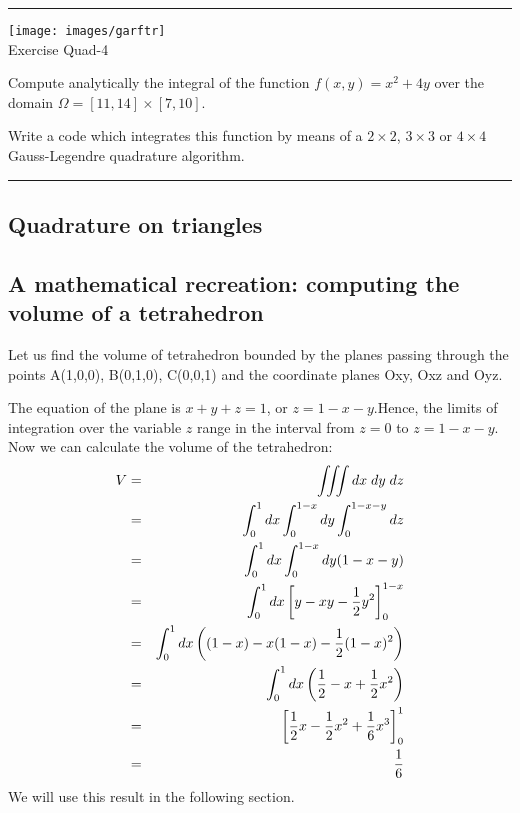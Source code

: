 \begin{center}
\begin{minipage}[t]{0.77\textwidth}
\par\noindent\rule{\textwidth}{0.4pt}

\begin{center}
\texttt{[image: images/garftr]} \\
{\color{orange}Exercise Quad-4}
\end{center}

Compute analytically the integral of the function $f(x,y)=x^2+4y$
over the domain $\Omega = [11,14 ] \times [7,10]$.

Write a code which integrates this function
by means of a $2\times 2$, $3\times 3$ or $4\times 4$ Gauss-Legendre quadrature algorithm.

\par\noindent\rule{\textwidth}{0.4pt}
\end{minipage}
\end{center}







\newpage
\subsection{Quadrature on triangles}




\subsection{A mathematical recreation: computing the volume of a tetrahedron}

Let us find the volume of tetrahedron bounded by the planes passing through the points 
A(1,0,0), B(0,1,0), C(0,0,1) and the coordinate planes Oxy, Oxz and Oyz.



The equation of the plane is $x+y+z=1$, or $z=1-x-y$.Hence, the limits of integration over 
the variable $z$ range in the interval from
$z=0$ to $z=1-x-y$. Now we can calculate the volume of the tetrahedron:
\begin{eqnarray}
V 
&=& \iiint dx \; dy \; dz \nonumber\\
&=& \int_0^1 dx \int_0^{1-x} dy \int_{0}^{1-x-y} dz \nonumber\\
&=& \int_0^1 dx \int_0^{1-x} dy (1-x-y) \nonumber\\
&=& \int_0^1 dx \left[y-xy-\frac12 y^2 \right]_0^{1-x} \nonumber\\
&=& \int_0^1 dx \left((1-x)-x(1-x)-\frac12 (1-x)^2 \right) \nonumber\\
&=& \int_0^1 dx \left(\frac12 -x + \frac12 x^2   \right) \nonumber\\
&=& \left[ \frac12 x  -\frac12 x^2 + \frac16 x^3   \right]_0^1 \nonumber\\
&=& \frac16
\end{eqnarray}
We will use this result in the following section.

